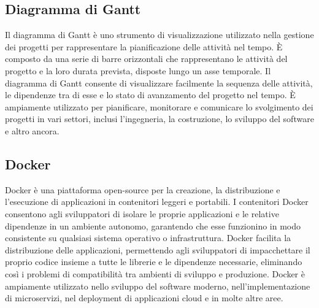 \vspace{2em}
\subsection*{Diagramma di Gantt}
Il diagramma di Gantt è uno strumento di visualizzazione utilizzato nella gestione dei progetti per rappresentare la pianificazione delle attività nel tempo. È composto da una serie di barre orizzontali che rappresentano le attività del progetto e la loro durata prevista, disposte lungo un asse temporale. Il diagramma di Gantt consente di visualizzare facilmente la sequenza delle attività, le dipendenze tra di esse e lo stato di avanzamento del progetto nel tempo. È ampiamente utilizzato per pianificare, monitorare e comunicare lo svolgimento dei progetti in vari settori, inclusi l'ingegneria, la costruzione, lo sviluppo del software e altro ancora.

\vspace{2em}
\subsection*{Docker}
Docker è una piattaforma open-source per la creazione, la distribuzione e l'esecuzione di applicazioni in contenitori leggeri e portabili. I contenitori Docker consentono agli sviluppatori di isolare le proprie applicazioni e le relative dipendenze in un ambiente autonomo, garantendo che esse funzionino in modo consistente su qualsiasi sistema operativo o infrastruttura. Docker facilita la distribuzione delle applicazioni, permettendo agli sviluppatori di impacchettare il proprio codice insieme a tutte le librerie e le dipendenze necessarie, eliminando così i problemi di compatibilità tra ambienti di sviluppo e produzione. Docker è ampiamente utilizzato nello sviluppo del software moderno, nell'implementazione di microservizi, nel deployment di applicazioni cloud e in molte altre aree.
